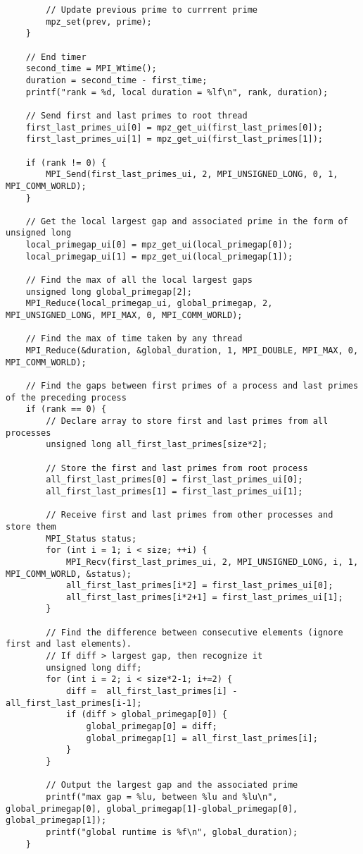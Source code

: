 \documentclass[12pt]{article}
\begin{document}
{\begin{lstlisting}
		// Update previous prime to currrent prime
		mpz_set(prev, prime);
	}

	// End timer
	second_time = MPI_Wtime();
	duration = second_time - first_time;
	printf("rank = %d, local duration = %lf\n", rank, duration);

	// Send first and last primes to root thread
	first_last_primes_ui[0] = mpz_get_ui(first_last_primes[0]);
	first_last_primes_ui[1] = mpz_get_ui(first_last_primes[1]);

	if (rank != 0) {
		MPI_Send(first_last_primes_ui, 2, MPI_UNSIGNED_LONG, 0, 1, MPI_COMM_WORLD);
	}

	// Get the local largest gap and associated prime in the form of unsigned long
	local_primegap_ui[0] = mpz_get_ui(local_primegap[0]);
	local_primegap_ui[1] = mpz_get_ui(local_primegap[1]);

	// Find the max of all the local largest gaps
	unsigned long global_primegap[2];
	MPI_Reduce(local_primegap_ui, global_primegap, 2, MPI_UNSIGNED_LONG, MPI_MAX, 0, MPI_COMM_WORLD);

	// Find the max of time taken by any thread
	MPI_Reduce(&duration, &global_duration, 1, MPI_DOUBLE, MPI_MAX, 0, MPI_COMM_WORLD);

	// Find the gaps between first primes of a process and last primes of the preceding process
	if (rank == 0) {
		// Declare array to store first and last primes from all processes
		unsigned long all_first_last_primes[size*2];

		// Store the first and last primes from root process
		all_first_last_primes[0] = first_last_primes_ui[0];
		all_first_last_primes[1] = first_last_primes_ui[1];

		// Receive first and last primes from other processes and store them
		MPI_Status status;
		for (int i = 1; i < size; ++i) {
			MPI_Recv(first_last_primes_ui, 2, MPI_UNSIGNED_LONG, i, 1, MPI_COMM_WORLD, &status);
			all_first_last_primes[i*2] = first_last_primes_ui[0];
			all_first_last_primes[i*2+1] = first_last_primes_ui[1];
		}

		// Find the difference between consecutive elements (ignore first and last elements).
		// If diff > largest gap, then recognize it
		unsigned long diff;
		for (int i = 2; i < size*2-1; i+=2) {
			diff =  all_first_last_primes[i] - all_first_last_primes[i-1];
			if (diff > global_primegap[0]) {
				global_primegap[0] = diff;
				global_primegap[1] = all_first_last_primes[i];
			}
		}

		// Output the largest gap and the associated prime
		printf("max gap = %lu, between %lu and %lu\n", global_primegap[0], global_primegap[1]-global_primegap[0], global_primegap[1]);
		printf("global runtime is %f\n", global_duration);
	}


\end{lstlisting}}
\end{document}
